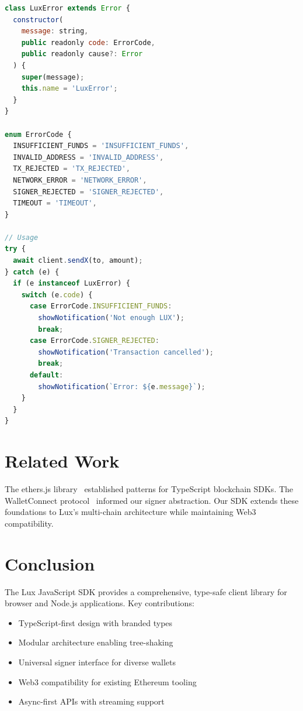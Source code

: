 \documentclass[11pt,twocolumn]{article}
\begin{document}
\begin{lstlisting}[language=JavaScript,caption=Error Types]
class LuxError extends Error {
  constructor(
    message: string,
    public readonly code: ErrorCode,
    public readonly cause?: Error
  ) {
    super(message);
    this.name = 'LuxError';
  }
}

enum ErrorCode {
  INSUFFICIENT_FUNDS = 'INSUFFICIENT_FUNDS',
  INVALID_ADDRESS = 'INVALID_ADDRESS',
  TX_REJECTED = 'TX_REJECTED',
  NETWORK_ERROR = 'NETWORK_ERROR',
  SIGNER_REJECTED = 'SIGNER_REJECTED',
  TIMEOUT = 'TIMEOUT',
}

// Usage
try {
  await client.sendX(to, amount);
} catch (e) {
  if (e instanceof LuxError) {
    switch (e.code) {
      case ErrorCode.INSUFFICIENT_FUNDS:
        showNotification('Not enough LUX');
        break;
      case ErrorCode.SIGNER_REJECTED:
        showNotification('Transaction cancelled');
        break;
      default:
        showNotification(`Error: ${e.message}`);
    }
  }
}
\end{lstlisting}

\section{Related Work}

The ethers.js library~\cite{ethers} established patterns for TypeScript blockchain SDKs. The WalletConnect protocol~\cite{walletconnect} informed our signer abstraction. Our SDK extends these foundations to Lux's multi-chain architecture while maintaining Web3 compatibility.

\section{Conclusion}

The Lux JavaScript SDK provides a comprehensive, type-safe client library for browser and Node.js applications. Key contributions:

\begin{itemize}
    \item TypeScript-first design with branded types
    \item Modular architecture enabling tree-shaking
    \item Universal signer interface for diverse wallets
    \item Web3 compatibility for existing Ethereum tooling
    \item Async-first APIs with streaming support
\end{itemize}
\end{document}
